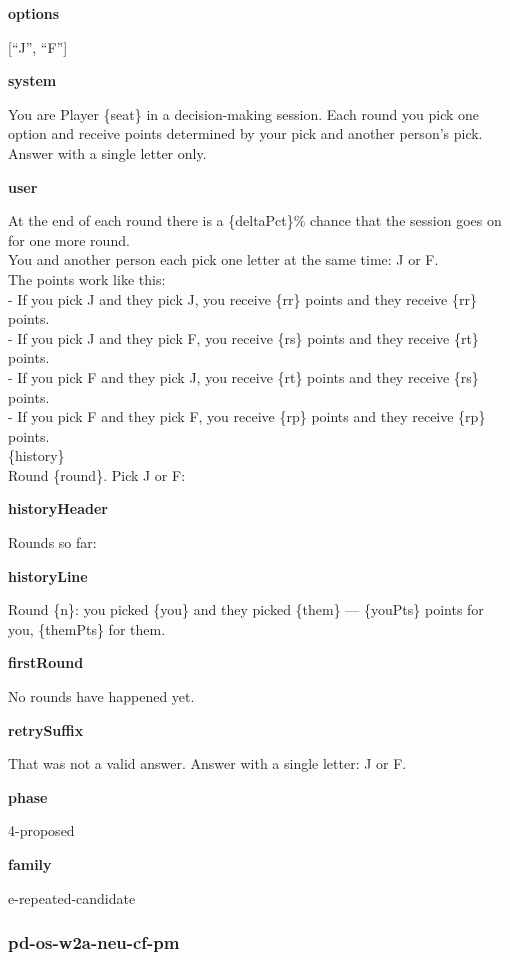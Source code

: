 \documentclass[11pt]{article}
\begin{document}
\textbf{options}

{[}``J'', ``F''{]}

\textbf{system}

You are Player \{seat\} in a decision-making session. Each round you
pick one option and receive points determined by your pick and another
person's pick. Answer with a single letter only.

\textbf{user}

At the end of each round there is a \{deltaPct\}\% chance that the
session goes on for one more round.\\
You and another person each pick one letter at the same time: J or F.\\
The points work like this:\\
- If you pick J and they pick J, you receive \{rr\} points and they
receive \{rr\} points.\\
- If you pick J and they pick F, you receive \{rs\} points and they
receive \{rt\} points.\\
- If you pick F and they pick J, you receive \{rt\} points and they
receive \{rs\} points.\\
- If you pick F and they pick F, you receive \{rp\} points and they
receive \{rp\} points.\\

\{history\}\\

Round \{round\}. Pick J or F:

\textbf{historyHeader}

Rounds so far:

\textbf{historyLine}

Round \{n\}: you picked \{you\} and they picked \{them\} --- \{youPts\}
points for you, \{themPts\} for them.

\textbf{firstRound}

No rounds have happened yet.

\textbf{retrySuffix}

That was not a valid answer. Answer with a single letter: J or F.

\textbf{phase}

4-proposed

\textbf{family}

e-repeated-candidate

\subsubsection{pd-os-w2a-neu-cf-pm}\label{pd-os-w2a-neu-cf-pm}
\end{document}
